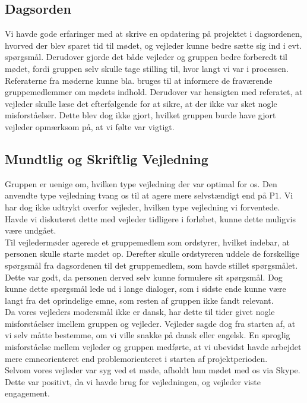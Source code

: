 \subsection{Dagsorden}
Vi havde gode erfaringer med at skrive en opdatering på projektet i dagsordenen, hvorved der blev sparet tid til mødet, og vejleder kunne bedre sætte sig ind i evt. spørgsmål. Derudover gjorde det både vejleder og gruppen bedre forberedt til mødet, fordi gruppen selv skulle tage stilling til, hvor langt vi var i processen. \\
Referaterne fra møderne kunne bla. bruges til at informere de fraværende gruppemedlemmer om mødets indhold. Derudover var hensigten med referatet, at vejleder skulle læse det efterfølgende for at sikre, at der ikke var sket nogle misforståelser. Dette blev dog ikke gjort, hvilket gruppen burde have gjort vejleder opmærksom på, at vi følte var vigtigt. 
	
\subsection{Mundtlig og Skriftlig Vejledning}
Gruppen er uenige om, hvilken type vejledning der var optimal for os. Den anvendte type vejledning tvang os til at agere mere selvstændigt end på P$1$. Vi har dog ikke udtrykt overfor vejleder, hvilken type vejledning vi forventede. Havde vi diskuteret dette med vejleder tidligere i forløbet, kunne dette muligvis være undgået. \\
Til vejledermøder agerede et gruppemedlem som ordstyrer, hvilket indebar, at personen skulle starte mødet op. Derefter skulle ordstyreren uddele de forskellige spørgsmål fra dagsordenen til det gruppemedlem, som havde stillet spørgsmålet. Dette var godt, da personen derved selv kunne formulere sit spørgsmål.
Dog kunne dette spørgsmål lede ud i lange dialoger, som i sidste ende kunne være langt fra det oprindelige emne, som resten af gruppen ikke fandt relevant. \\ %
Da vores vejleders modersmål ikke er dansk, har dette til tider givet nogle misforståelser imellem gruppen og vejleder. Vejleder sagde dog fra starten af, at vi selv måtte bestemme, om vi ville snakke på dansk eller engelsk. En sproglig misforståelse mellem vejleder og gruppen medførte, at vi ubevidst havde arbejdet mere emneorienteret end problemorienteret i starten af projektperioden. \\
Selvom vores vejleder var syg ved et møde, afholdt hun mødet med os via Skype. Dette var positivt, da vi havde brug for vejledningen, og vejleder viste engagement.
	
